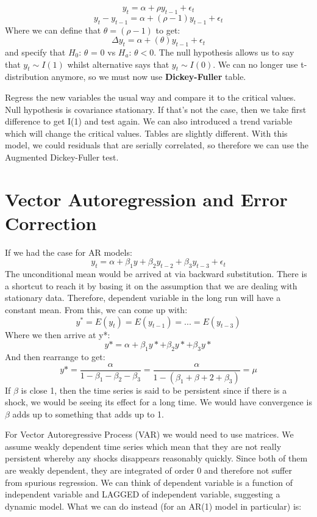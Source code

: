 \documentclass[11pt, oneside]{article}
\theoremstyle{definition}
\begin{document}
$$
y_t = \alpha + \rho y_{t-1} + \epsilon_t
$$
$$
y_t - y_{t-1} = \alpha + (\rho-1)y_{t-1} + \epsilon_t
$$
Where we can define that $\theta = (\rho-1)$ to get:
$$
\Delta y_t = \alpha + (\theta)y_{t-1} + \epsilon_t
$$
and specify that $H_0$: $\theta$ = 0 vs $H_a$: $\theta < 0$. The null hypothesis allows us to say that $y_t \sim I(1)$ whilst alternative says that $y_t \sim I(0)$. We can no longer use t-distribution anymore, so we must now use \textbf{Dickey-Fuller} table.



Regress the new variables the usual way and compare it to the critical values. Null hypothesis is covariance stationary. If that's not the case, then we take first difference to get I(1) and test again. We can also introduced a trend variable which will change the critical values. Tables are slightly different. With this model, we could residuals that are serially correlated, so therefore we can use the Augmented Dickey-Fuller test.
\newpage
\section{Vector Autoregression and Error Correction}

If we had the case for AR models:
$$
y_t = \alpha + \beta_1y + \beta_2y_{t-2} + \beta_3y_{t-3} + \epsilon_t
$$
The unconditional mean would be arrived at via backward substitution. There is a shortcut to reach it by basing it on the assumption that we are dealing with stationary data. Therefore, dependent variable in the long run will have a constant mean. From this, we can come up with:
$$
y^* = E(y_t) = E(y_{t-1}) = ... = E(y_{t-3})
$$
Where we then arrive at y*:
$$
y* = \alpha + \beta_1y* + \beta_2y* + \beta_3y*
$$
And then rearrange to get:
$$
y* = \frac{\alpha}{1 - \beta_1 - \beta_2 - \beta_3} = \frac{\alpha}{1-(\beta_1 + \beta+2 + \beta_3)} = \mu
$$
If $\beta$ is close 1, then the time series is said to be persistent since if there is a shock, we would be seeing its effect for a long time. We would have convergence is $\beta$ adds up to something that adds up to 1.

For Vector Autoregressive Process (VAR) we would need to use matrices. We assume weakly dependent time series which mean that they are not really persistent whereby any shocks disappears reasonably quickly. Since both of them are weakly dependent, they are integrated of order 0 and therefore not suffer from spurious regression. We can think of dependent variable is a function of independent variable and LAGGED of independent variable, suggesting a dynamic model. What we can do instead (for an AR(1) model in particular) is:
\end{document}
